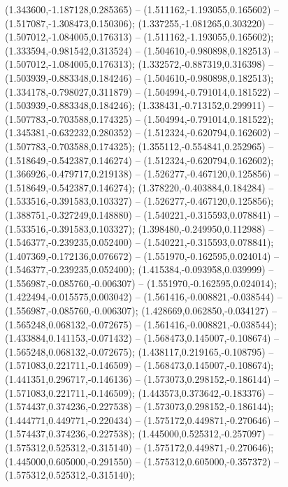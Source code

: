  (1.343600,-1.187128,0.285365) -- (1.511162,-1.193055,0.165602) -- (1.517087,-1.308473,0.150306);
 (1.337255,-1.081265,0.303220) -- (1.507012,-1.084005,0.176313) -- (1.511162,-1.193055,0.165602);
 (1.333594,-0.981542,0.313524) -- (1.504610,-0.980898,0.182513) -- (1.507012,-1.084005,0.176313);
 (1.332572,-0.887319,0.316398) -- (1.503939,-0.883348,0.184246) -- (1.504610,-0.980898,0.182513);
 (1.334178,-0.798027,0.311879) -- (1.504994,-0.791014,0.181522) -- (1.503939,-0.883348,0.184246);
 (1.338431,-0.713152,0.299911) -- (1.507783,-0.703588,0.174325) -- (1.504994,-0.791014,0.181522);
 (1.345381,-0.632232,0.280352) -- (1.512324,-0.620794,0.162602) -- (1.507783,-0.703588,0.174325);
 (1.355112,-0.554841,0.252965) -- (1.518649,-0.542387,0.146274) -- (1.512324,-0.620794,0.162602);
 (1.366926,-0.479717,0.219138) -- (1.526277,-0.467120,0.125856) -- (1.518649,-0.542387,0.146274);
 (1.378220,-0.403884,0.184284) -- (1.533516,-0.391583,0.103327) -- (1.526277,-0.467120,0.125856);
 (1.388751,-0.327249,0.148880) -- (1.540221,-0.315593,0.078841) -- (1.533516,-0.391583,0.103327);
 (1.398480,-0.249950,0.112988) -- (1.546377,-0.239235,0.052400) -- (1.540221,-0.315593,0.078841);
 (1.407369,-0.172136,0.076672) -- (1.551970,-0.162595,0.024014) -- (1.546377,-0.239235,0.052400);
 (1.415384,-0.093958,0.039999) -- (1.556987,-0.085760,-0.006307) -- (1.551970,-0.162595,0.024014);
 (1.422494,-0.015575,0.003042) -- (1.561416,-0.008821,-0.038544) -- (1.556987,-0.085760,-0.006307);
 (1.428669,0.062850,-0.034127) -- (1.565248,0.068132,-0.072675) -- (1.561416,-0.008821,-0.038544);
 (1.433884,0.141153,-0.071432) -- (1.568473,0.145007,-0.108674) -- (1.565248,0.068132,-0.072675);
 (1.438117,0.219165,-0.108795) -- (1.571083,0.221711,-0.146509) -- (1.568473,0.145007,-0.108674);
 (1.441351,0.296717,-0.146136) -- (1.573073,0.298152,-0.186144) -- (1.571083,0.221711,-0.146509);
 (1.443573,0.373642,-0.183376) -- (1.574437,0.374236,-0.227538) -- (1.573073,0.298152,-0.186144);
 (1.444771,0.449771,-0.220434) -- (1.575172,0.449871,-0.270646) -- (1.574437,0.374236,-0.227538);
 (1.445000,0.525312,-0.257097) -- (1.575312,0.525312,-0.315140) -- (1.575172,0.449871,-0.270646);
 (1.445000,0.605000,-0.291550) -- (1.575312,0.605000,-0.357372) -- (1.575312,0.525312,-0.315140);
